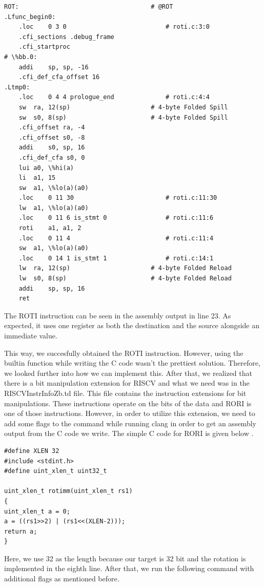 \begin{lstlisting}
ROT:                                    # @ROT
.Lfunc_begin0:
	.loc	0 3 0                           # roti.c:3:0
	.cfi_sections .debug_frame
	.cfi_startproc
# \%bb.0:
	addi	sp, sp, -16
	.cfi_def_cfa_offset 16
.Ltmp0:
	.loc	0 4 4 prologue_end              # roti.c:4:4
	sw	ra, 12(sp)                      # 4-byte Folded Spill
	sw	s0, 8(sp)                       # 4-byte Folded Spill
	.cfi_offset ra, -4
	.cfi_offset s0, -8
	addi	s0, sp, 16
	.cfi_def_cfa s0, 0
	lui	a0, \%hi(a)
	li	a1, 15
	sw	a1, \%lo(a)(a0)
	.loc	0 11 30                         # roti.c:11:30
	lw	a1, \%lo(a)(a0)
	.loc	0 11 6 is_stmt 0                # roti.c:11:6
	roti	a1, a1, 2
	.loc	0 11 4                          # roti.c:11:4
	sw	a1, \%lo(a)(a0)
	.loc	0 14 1 is_stmt 1                # roti.c:14:1
	lw	ra, 12(sp)                      # 4-byte Folded Reload
	lw	s0, 8(sp)                       # 4-byte Folded Reload
	addi	sp, sp, 16
	ret
\end{lstlisting}

The ROTI instruction can be seen in the assembly output in line 23. As expected, it uses one register as both  the destination and the source alongside an immediate value.

This way, we succesfully obtained the ROTI instruction. However, using the builtin function while writing the C code wasn’t the prettiest solution. Therefore, we looked further into how we can implement this. After that, we realized that there is a bit manipulation extension for RISCV and what we need was in the RISCVInstrInfoZb.td file. This file contains the instruction extensions for bit manipulations. These instructions operate on the bits of the data and RORI is one of those instructions. However, in order to utilize this extension, we need to add some flags to the command while running clang in order to get an assembly output from the C code we write. The simple C code for RORI is given below .%

\begin{lstlisting}
#define XLEN 32
#include <stdint.h>
#define uint_xlen_t uint32_t

uint_xlen_t rotimm(uint_xlen_t rs1)
{
uint_xlen_t a = 0;
a = ((rs1>>2) | (rs1<<(XLEN-2)));
return a;
}
\end{lstlisting}

Here, we use 32 as the length because our target is 32 bit and the rotation is implemented in the eighth line. After that, we run the following command with additional flags as mentioned before.

